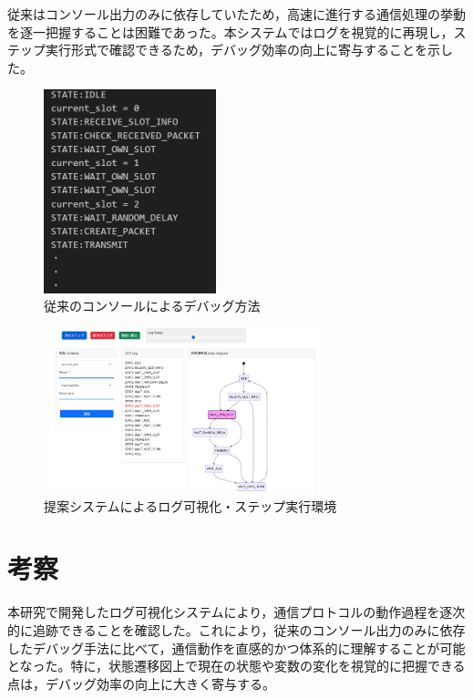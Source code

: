 \documentclass[technicalreport]{ieicej}
\begin{document}
従来はコンソール出力のみに依存していたため，高速に進行する通信処理の挙動を逐一把握することは困難であった。本システムではログを視覚的に再現し，ステップ実行形式で確認できるため，デバッグ効率の向上に寄与することを示した。
\begin{figure}[tb]
  \centering
  \includegraphics[width=50mm]{./images/old_debug.png}
  \caption{従来のコンソールによるデバッグ方法}
  \label{fig:old-debug}
\end{figure}
\begin{figure}[tb]
  \centering
  \includegraphics[width=80mm]{./images/step_3.png}
  \caption{提案システムによるログ可視化・ステップ実行環境}
  \label{fig:viewer-ui}
\end{figure}


\section{考察}
本研究で開発したログ可視化システムにより，通信プロトコルの動作過程を逐次的に追跡できることを確認した。これにより，従来のコンソール出力のみに依存したデバッグ手法に比べて，通信動作を直感的かつ体系的に理解することが可能となった。特に，状態遷移図上で現在の状態や変数の変化を視覚的に把握できる点は，デバッグ効率の向上に大きく寄与する。
\end{document}
